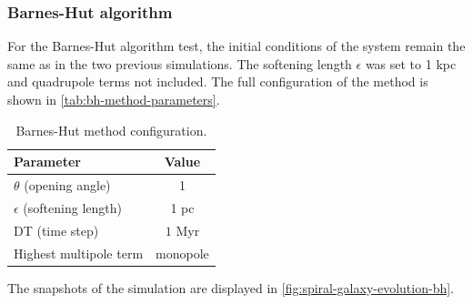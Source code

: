 \subsubsection{Barnes-Hut algorithm}
For the Barnes-Hut algorithm test, the initial conditions of the system remain the same as in the two previous simulations.
The softening length $\epsilon$ was set to 1 kpc and quadrupole terms not included.
The full configuration of the method is shown in \autoref{tab:bh-method-parameters}.
\begin{table}[htp]
    \centering
    \begin{tabular}{|l|c|}
        \hline
        \textbf{Parameter}            & \textbf{Value} \\
        \hline
        $\theta$ (opening angle)      & 1              \\
        $\epsilon$ (softening length) & 1 pc           \\
        DT (time step)                & $1$ Myr        \\
        Highest multipole term        & monopole       \\
        \hline
    \end{tabular}
    \caption{Barnes-Hut method configuration.}
    \label{tab:bh-method-parameters}
\end{table}
The snapshots of the simulation are displayed in \autoref{fig:spiral-galaxy-evolution-bh}.

